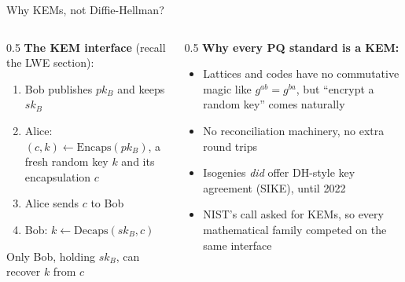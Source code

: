 \ifdefined\PRESENTATION\else\PassOptionsToClass{handout}{beamer}\fi\documentclass[aspectratio=169, lualatex]{beamer}
\begin{document}
\begin{frame}{Why KEMs, not Diffie-Hellman?}
	\begin{columns}[c]
		\begin{column}{0.5\textwidth}
			\textbf{The KEM interface} (recall the LWE section):
			\begin{enumerate}
				\item Bob publishes $pk_B$ and keeps $sk_B$
				\item Alice: $(c, k) \leftarrow \text{Encaps}(pk_B)$, a fresh random key $k$ and its encapsulation $c$
				\item Alice sends $c$ to Bob
				\item Bob: $k \leftarrow \text{Decaps}(sk_B, c)$
			\end{enumerate}
			Only Bob, holding $sk_B$, can recover $k$ from $c$
		\end{column}
		\begin{column}{0.5\textwidth}
			\textbf{Why every PQ standard is a KEM:}
			\begin{itemize}
				\item Lattices and codes have no commutative magic like $g^{ab} = g^{ba}$, but ``encrypt a random key'' comes naturally
				\item No reconciliation machinery, no extra round trips
				\item Isogenies \textit{did} offer DH-style key agreement (SIKE), until 2022
				\item NIST's call asked for KEMs, so every mathematical family competed on the same interface
			\end{itemize}
		\end{column}
	\end{columns}
\end{frame}
\end{document}
